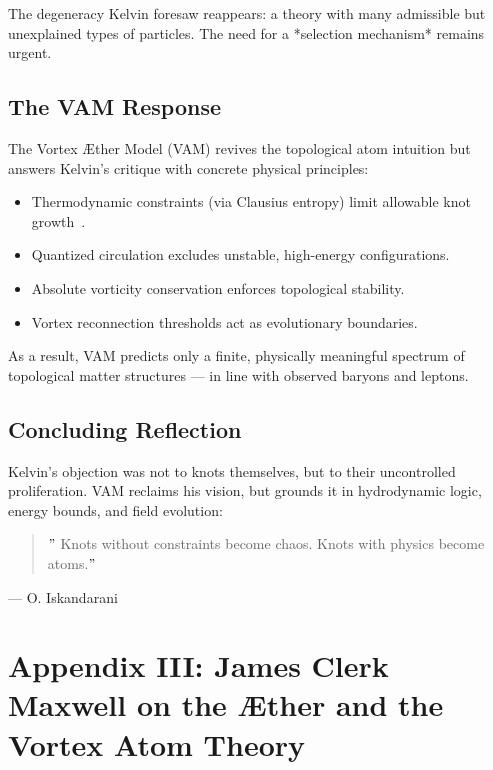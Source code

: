 \documentclass[preprint]{revtex4-2}
\begin{document}
    The degeneracy Kelvin foresaw reappears: a theory with many admissible but unexplained types of particles. The need for a *selection mechanism* remains urgent.

    \subsection*{The VAM Response}

    The Vortex Æther Model (VAM) revives the topological atom intuition but answers Kelvin's critique with concrete physical principles:

    \begin{itemize}
      \item Thermodynamic constraints (via Clausius entropy) limit allowable knot growth~\cite{clausius1865entropy}.
      \item Quantized circulation excludes unstable, high-energy configurations.
      \item Absolute vorticity conservation enforces topological stability.
      \item Vortex reconnection thresholds act as evolutionary boundaries.
    \end{itemize}

    As a result, VAM predicts only a finite, physically meaningful spectrum of topological matter structures — in line with observed baryons and leptons.

    \subsection*{Concluding Reflection}

    Kelvin's objection was not to knots themselves, but to their uncontrolled proliferation. VAM reclaims his vision, but grounds it in hydrodynamic logic, energy bounds, and field evolution:

    \begin{quote}
     \("\) Knots without constraints become chaos. Knots with physics become atoms.\("\)
    \end{quote}
   \hfill — O. Iskandarani

\section*{Appendix III: James Clerk Maxwell on the Æther and the Vortex Atom Theory}
\label{appendix:maxwell}
\end{document}
